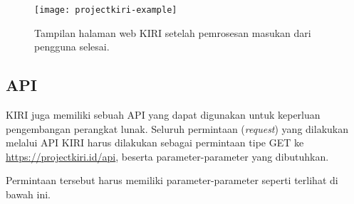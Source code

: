 \begin{figure}[ht]
    \centering
    \texttt{[image: projectkiri-example]}
    \caption[Tampilan akhir halaman web KIRI]{Tampilan halaman web KIRI setelah pemrosesan masukan dari pengguna selesai.}
    \label{fig:kiri-example}
\end{figure}

\subsection{API}
\label{sec:kiri-api}

KIRI juga memiliki sebuah API yang dapat digunakan untuk keperluan pengembangan perangkat lunak. Seluruh permintaan (\textit{request}) yang dilakukan melalui API KIRI harus dilakukan sebagai permintaan tipe GET ke \href{https://projectkiri.id/api}{https://projectkiri.id/api}, beserta parameter-parameter yang dibutuhkan. 

Permintaan tersebut harus memiliki parameter-parameter seperti terlihat di bawah ini.

